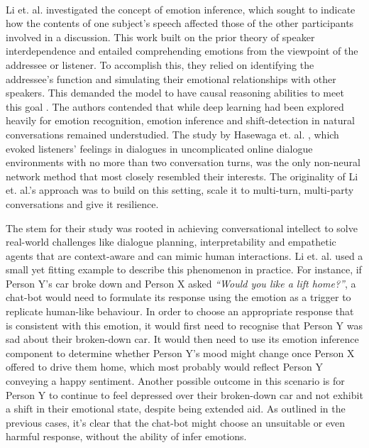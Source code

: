 \\
Li et. al. investigated the concept of emotion inference, which sought to indicate how the contents of one subject's speech affected those of the other participants involved in a discussion. This work built on the prior theory of speaker interdependence and entailed comprehending emotions from the viewpoint of the addressee or listener. To accomplish this, they relied on identifying the addressee's function and simulating their emotional relationships with other speakers. This demanded the model to have causal reasoning abilities to meet this goal \cite{Li2021EnhancingEI}.  The authors contended that while deep learning had been explored heavily for emotion recognition, emotion inference and shift-detection in natural conversations remained understudied. The study by Hasewaga et. al. \cite{hasegawa-etal-2013-predicting}, which evoked listeners' feelings in  dialogues in uncomplicated online dialogue environments with no more than two conversation turns, was the only non-neural network method that most closely resembled their interests. The originality of Li et. al.'s approach was to build on this setting, scale it to multi-turn, multi-party conversations and give it resilience.

The stem for their study was rooted in achieving conversational intellect to solve real-world challenges like dialogue planning, interpretability and empathetic agents that are context-aware and can mimic human interactions. Li et. al. used a small yet fitting example to describe this phenomenon in practice. For instance, if Person Y's car broke down and Person X asked \textit{``Would you like a lift home?''}, a chat-bot would need to formulate its response using the emotion as a trigger to replicate human-like behaviour. In order to choose an appropriate response that is consistent with this emotion, it would first need to recognise that Person Y was sad about their broken-down car. It would then need to use its emotion inference component to determine whether Person Y's mood might change once Person X offered to drive them home, which most probably would reflect Person Y conveying a happy sentiment. Another possible outcome in this scenario is for Person Y to continue to feel depressed over their broken-down car and not exhibit a shift in their emotional state, despite being extended aid. As outlined in the previous cases, it's clear that the chat-bot might choose an unsuitable or even harmful response, without the ability of infer emotions.

